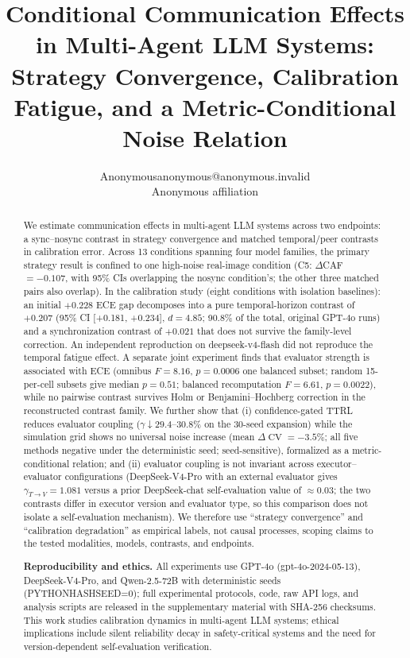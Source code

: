 \documentclass[11pt]{article}
\title{Conditional Communication Effects in Multi-Agent LLM Systems: Strategy Convergence, Calibration Fatigue, and a Metric-Conditional Noise Relation}
\author{\name Anonymous\email anonymous@anonymous.invalid\\\addr Anonymous affiliation}
\date{}
\DeclareMathOperator{\CV}{CV}
\begin{document}
\maketitle

\begin{abstract}
We estimate communication effects in multi-agent LLM systems across two endpoints: a sync--nosync contrast in strategy convergence and matched temporal/peer contrasts in calibration error. Across 13 conditions spanning four model families, the primary strategy result is confined to one high-noise real-image condition (C5: $\Delta$CAF $=-0.107$, with 95\% CIs overlapping the nosync condition's; the other three matched pairs also overlap). In the calibration study (eight conditions with isolation baselines): an initial $+0.228$ ECE gap decomposes into a pure temporal-horizon contrast of $+0.207$ (95\% CI [+0.181, +0.234], $d{=}4.85$; 90.8\% of the total, original GPT-4o runs) and a synchronization contrast of $+0.021$ that does not survive the family-level correction. An independent reproduction on deepseek-v4-flash did not reproduce the temporal fatigue effect. A separate joint experiment finds that evaluator strength is associated with ECE (omnibus $F{=}8.16$, $p{=}0.0006$ one balanced subset; random 15-per-cell subsets give median $p{=}0.51$; balanced recomputation $F{=}6.61$, $p{=}0.0022$), while no pairwise contrast survives Holm or Benjamini--Hochberg correction in the reconstructed contrast family. We further show that (i) confidence-gated TTRL reduces evaluator coupling ($\gamma \downarrow 29.4$--$30.8\%$ on the 30-seed expansion) while the simulation grid shows no universal noise increase (mean $\Delta\CV = -3.5\%$; all five methods negative under the deterministic seed; seed-sensitive), formalized as a metric-conditional relation; and (ii) evaluator coupling is not invariant across executor--evaluator configurations (DeepSeek-V4-Pro with an external evaluator gives $\gamma_{T\to V}{=}1.081$ versus a prior DeepSeek-chat self-evaluation value of $\approx 0.03$; the two contrasts differ in executor version and evaluator type, so this comparison does not isolate a self-evaluation mechanism). We therefore use ``strategy convergence'' and ``calibration degradation'' as empirical labels, not causal processes, scoping claims to the tested modalities, models, contrasts, and endpoints.


	\textbf{Reproducibility and ethics.} All experiments use GPT-4o (gpt-4o-2024-05-13), DeepSeek-V4-Pro, and Qwen-2.5-72B with deterministic seeds (PYTHONHASHSEED=0); full experimental protocols, code, raw API logs, and analysis scripts are released in the supplementary material with SHA-256 checksums. This work studies calibration dynamics in multi-agent LLM systems; ethical implications include silent reliability decay in safety-critical systems and the need for version-dependent self-evaluation verification.\end{abstract}
\end{document}
